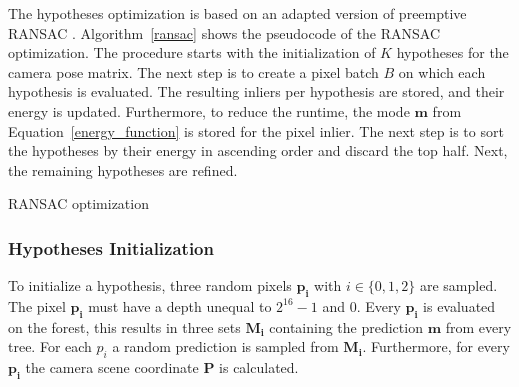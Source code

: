 \documentclass[final]{cvpr}
\begin{document}
The hypotheses optimization is based on an adapted version of preemptive RANSAC \cite{shotton2013}.
Algorithm~\ref{ransac} shows the pseudocode of the RANSAC optimization.
The procedure starts with the initialization of $K$ hypotheses for the camera pose matrix. 
The next step is to create a pixel batch $B$ on which each hypothesis is evaluated. The resulting inliers per hypothesis  are stored, and their energy is 
updated. Furthermore, to reduce the runtime, the mode $\boldsymbol{m}$ from Equation~\ref{energy_function} is stored for
the pixel inlier.
The next step is to sort the hypotheses by their energy in ascending order and discard the top half. Next, the remaining hypotheses are refined.

\begin{algorithm}
	\caption{RANSAC optimization}
	\label{ransac}
\end{algorithm}

\subsubsection{Hypotheses Initialization}
To initialize a hypothesis, three random pixels $$ with $i \in \{0,1,2\}$ are sampled. 
The pixel $$ must have a depth unequal to $2^{16}-1$ and $0$. Every $$ is 
evaluated on the forest, this results in three sets 
$$ containing the prediction $$ from every tree. For each $p_{i}$ a random 
prediction is sampled from $$. Furthermore, for every $$ the camera scene 
coordinate $$ is calculated.
\end{document}
